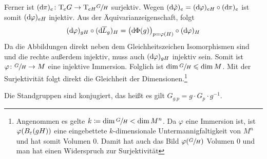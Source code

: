 \begin{beweis}
\begin{itemize}[itemsep=1pt]
		Ferner ist $(\mathd \pi)_e \colon \Tmap_e G \to \Tmap_{eH} \sfrac{G}{H}$ surjektiv.
		Wegen $(\mathd \hat{\varphi})_e = (\mathd \varphi)_{eH} \circ  (\mathd \pi)_e$ ist somit $(\mathd \varphi)_{eH}$ injektiv.
		Aus der Äquivarianzeigenschaft, folgt 
		\[
			(\mathd \varphi)_{gH}\circ (\mathd\overline{L}_g)_H = \enbrace[\big]{\mathd\Phi(g)}_{p=\varphi(H)} \circ (\mathd \varphi)_H
		\]
		Da die Abbildungen direkt neben dem Gleichheitszeichen Isomorphismen sind und die rechte außerdem injektiv, muss auch $(\mathd \varphi)_{gH}$ injektiv sein.
		Somit ist $\varphi \colon \sfrac{G}{H} \to M$ eine injektive Immersion.
		Folglich ist $\dim \sfrac{G}{H} \le \dim M$.
		Mit der Surjektivität folgt direkt die Gleichheit der Dimensionen.\footnote{Angenommen es gelte $k \coloneqq \dim \sfrac{G}{H} < \dim M^n$. Da $\varphi$ eine Immersion ist, ist $\varphi \enbrace*{B_\varepsilon(gH)}$ eine eingebettete $k$-dimensionale Untermannigfaltigkeit von $M^n$ und hat somit Volumen 0.
		Damit hat auch das Bild $\varphi(\sfrac{G}{H})$ Volumen 0 und man hat einen Widerspruch zur Surjektivität}\qedhere
	\end{itemize}
\end{beweis}

\begin{bemerkung*}[{name=[Standgruppen sind konjugiert]}]
	Die Standgruppen sind konjugiert, das heißt es gilt $G_{g.p} = g \cdot G_p \cdot  g^{-1}$.
\end{bemerkung*}


